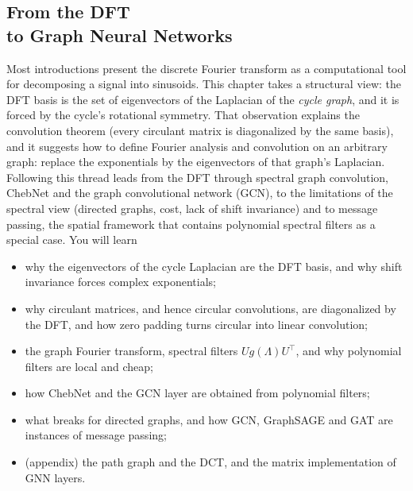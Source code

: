 \begin{notechapter}
\chapter[From the DFT to Graph Neural Networks]{From the DFT\texorpdfstring{\\}{ } to Graph Neural Networks}\label{ch:dft-to-gnn}

\begin{chapterintro}
Most introductions present the discrete Fourier transform as a computational tool for decomposing a signal into sinusoids. This chapter takes a structural view: the DFT basis is the set of eigenvectors of the Laplacian of the \emph{cycle graph}, and it is forced by the cycle's rotational symmetry. That observation explains the convolution theorem (every circulant matrix is diagonalized by the same basis), and it suggests how to define Fourier analysis and convolution on an arbitrary graph: replace the exponentials by the eigenvectors of that graph's Laplacian. Following this thread leads from the DFT through spectral graph convolution, ChebNet and the graph convolutional network (GCN), to the limitations of the spectral view (directed graphs, cost, lack of shift invariance) and to message passing, the spatial framework that contains polynomial spectral filters as a special case. You will learn
\begin{itemize}[nosep]
  \item why the eigenvectors of the cycle Laplacian are the DFT basis, and why shift invariance forces complex exponentials;
  \item why circulant matrices, and hence circular convolutions, are diagonalized by the DFT, and how zero padding turns circular into linear convolution;
  \item the graph Fourier transform, spectral filters $U g(\Lambda) U^\top$, and why polynomial filters are local and cheap;
  \item how ChebNet and the GCN layer are obtained from polynomial filters;
  \item what breaks for directed graphs, and how GCN, GraphSAGE and GAT are instances of message passing;
  \item (appendix) the path graph and the DCT, and the matrix implementation of GNN layers.
\end{itemize}
\end{chapterintro}


\end{notechapter}
